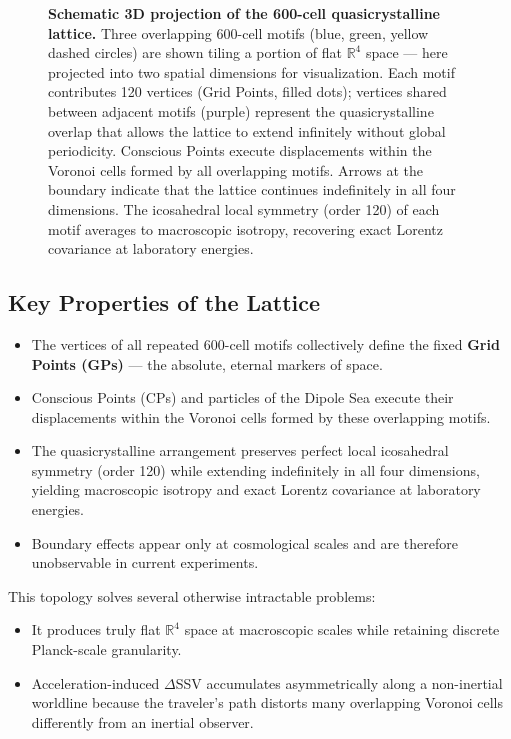 \documentclass[11pt,letterpaper]{article}
\begin{document}
\begin{figure}[H]
  \centering
  
  \caption{%
    \textbf{Schematic 3D projection of the 600-cell quasicrystalline lattice.}
    Three overlapping 600-cell motifs (blue, green, yellow dashed circles) are
    shown tiling a portion of flat $\mathbb{R}^4$ space — here projected into
    two spatial dimensions for visualization. Each motif contributes 120
    vertices (Grid Points, filled dots); vertices shared between adjacent motifs
    (purple) represent the quasicrystalline overlap that allows the lattice to
    extend infinitely without global periodicity. Conscious Points execute
    displacements within the Voronoi cells formed by all overlapping motifs.
    Arrows at the boundary indicate that the lattice continues indefinitely in
    all four dimensions. The icosahedral local symmetry (order 120) of each
    motif averages to macroscopic isotropy, recovering exact Lorentz covariance
    at laboratory energies.
  }
  \label{fig:lattice}
\end{figure}


\subsection{Key Properties of the Lattice}

\begin{itemize}
\item The vertices of all repeated 600-cell motifs collectively define the fixed \textbf{Grid Points (GPs)} --- the absolute, eternal markers of space.
\item Conscious Points (CPs) and particles of the Dipole Sea execute their displacements within the Voronoi cells formed by these overlapping motifs.
\item The quasicrystalline arrangement preserves perfect local icosahedral symmetry (order 120) while extending indefinitely in all four dimensions, yielding macroscopic isotropy and exact Lorentz covariance at laboratory energies.
\item Boundary effects appear only at cosmological scales and are therefore unobservable in current experiments.
\end{itemize}

This topology solves several otherwise intractable problems:

\begin{itemize}
\item It produces truly flat $\mathbb{R}^4$ space at macroscopic scales while retaining discrete Planck-scale granularity.
\item Acceleration-induced $\Delta$SSV accumulates asymmetrically along a non-inertial worldline because the traveler's path distorts many overlapping Voronoi cells differently from an inertial observer.
\end{itemize}
\end{document}
